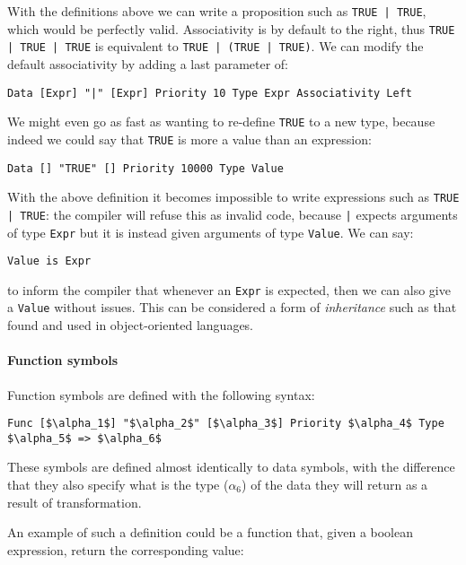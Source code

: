 With the definitions above we can write a proposition such as \texttt{TRUE | TRUE}, which would be perfectly valid. Associativity is by default to the right, thus \texttt{TRUE | TRUE | TRUE} is equivalent to \texttt{TRUE | (TRUE | TRUE)}. We can modify the default associativity by adding a last parameter of:

\begin{lstlisting}
Data [Expr] "|" [Expr] Priority 10 Type Expr Associativity Left
\end{lstlisting}

We might even go as fast as wanting to re-define \texttt{TRUE} to a new type, because indeed we could say that \texttt{TRUE} is more a value than an expression:

\begin{lstlisting}
Data [] "TRUE" [] Priority 10000 Type Value
\end{lstlisting}

With the above definition it becomes impossible to write expressions such as \texttt{TRUE | TRUE}: the compiler will refuse this as invalid code, because \texttt{|} expects arguments of type \texttt{Expr} but it is instead given arguments of type \texttt{Value}. We can say:

\begin{lstlisting}
Value is Expr
\end{lstlisting}

to inform the compiler that whenever an \texttt{Expr} is expected, then we can also give a \texttt{Value} without issues. This can be considered a form of \textit{inheritance} such as that found and used in object-oriented languages.


\paragraph{Function symbols}
Function symbols are defined with the following syntax:

\begin{lstlisting}[mathescape=true]
Func [$\alpha_1$] "$\alpha_2$" [$\alpha_3$] Priority $\alpha_4$ Type $\alpha_5$ => $\alpha_6$
\end{lstlisting}

These symbols are defined almost identically to data symbols, with the difference that they also specify what is the type ($\alpha_6$) of the data they will return as a result of transformation.

An example of such a definition could be a function that, given a boolean expression, return the corresponding value:

